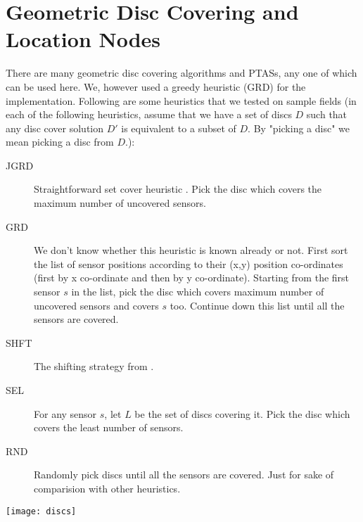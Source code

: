 \section{Geometric Disc Covering and Location Nodes}
There are many \cite{gmdc} \cite{dudc} \cite{shifting} geometric disc covering algorithms and PTASs, any one of which can be used here. We, however used a greedy heuristic (GRD) for the implementation. Following are some heuristics that we tested on sample fields (in each of the following heuristics, assume that we have a set of discs $D$ such that any disc cover solution $D'$ is equivalent to a subset of $D$. By "picking a disc" we mean picking a disc from $D$.):
\begin{description}
\item[JGRD] Straightforward set cover heuristic \cite{jgreedy}. Pick the disc which covers the maximum number of uncovered sensors.
\item[GRD] We don't know whether this heuristic is known already or not. First sort the list of sensor positions according to their (x,y) position co-ordinates (first by x co-ordinate and then by y co-ordinate). Starting from the first sensor $s$ in the list, pick the disc which covers maximum number of uncovered sensors and covers $s$ too. Continue down this list until all the sensors are covered.
\item[SHFT] The shifting strategy from \cite{shifting}.
\item[SEL] For any sensor $s$, let $L$ be the set of discs covering it. Pick the disc which covers the least number of sensors.
\item[RND] Randomly pick discs until all the sensors are covered. Just for sake of comparision with other heuristics.
\end{description}

\texttt{[image: discs]}